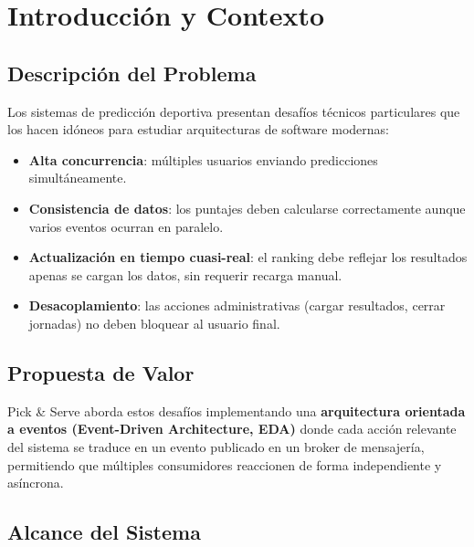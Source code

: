\documentclass[12pt,a4paper]{article}
\begin{document}
\tableofcontents
\newpage

\section{Introducción y Contexto}

\subsection{Descripción del Problema}

Los sistemas de predicción deportiva presentan desafíos técnicos particulares que los hacen
idóneos para estudiar arquitecturas de software modernas:

\begin{itemize}
  \item \textbf{Alta concurrencia}: múltiples usuarios enviando predicciones simultáneamente.
  \item \textbf{Consistencia de datos}: los puntajes deben calcularse correctamente aunque
        varios eventos ocurran en paralelo.
  \item \textbf{Actualización en tiempo cuasi-real}: el ranking debe reflejar los resultados
        apenas se cargan los datos, sin requerir recarga manual.
  \item \textbf{Desacoplamiento}: las acciones administrativas (cargar resultados, cerrar
        jornadas) no deben bloquear al usuario final.
\end{itemize}

\subsection{Propuesta de Valor}

Pick \& Serve aborda estos desafíos implementando una \textbf{arquitectura orientada a eventos
(Event-Driven Architecture, EDA)} donde cada acción relevante del sistema se traduce en un
evento publicado en un broker de mensajería, permitiendo que múltiples consumidores reaccionen
de forma independiente y asíncrona.

\subsection{Alcance del Sistema}
\end{document}
